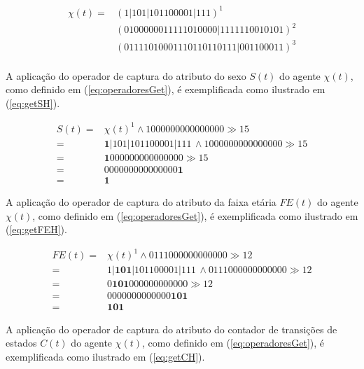 \begin{equation}
\begin{split}
 \chi(t) =   & (1 | 1 0 1 | 1 0 1 1 0 0 0 0 1 | 1 1 1)^1 \\
	     & (0 1 0 0 0 0 0 0 1 1 1 1 1 0 1 0 0 0 0 | 1 1 1 1 1 1 0 0 1 0 1 0 1)^2 \\
	     & (0 1 1 1 1 0 1 0 0 0 1 1 1 0 1 1 0 1 1 0 1 1 1 | 0 0 1 1 0 0 0 1 1)^3 \\
 \label{eq:Exemplo1}
\end{split}
\end{equation}

A aplicação do operador de captura do atributo do sexo $S(t)$ do agente $\chi(t)$, como definido em (\ref{eq:operadoresGet}), é exemplificada como ilustrado em (\ref{eq:getSH}).

\begin{equation}
 \begin{split}
 S(t) = & \chi(t)^1 \wedge 1000000000000000 \gg 15 \\
      = & \boldsymbol{1} | 1 0 1 | 1 0 1 1 0 0 0 0 1 | 1 1 1 \, \wedge 1000000000000000 \gg 15 \\
      = & \boldsymbol{1} 0 0 0 0 0 0 0 0 0 0 0 0 0 0 0 \gg 15 \\
      = & 0 0 0 0 0 0 0 0 0 0 0 0 0 0 0 \boldsymbol{1} \\
      = & \boldsymbol{1}
 \label{eq:getSH}
 \end{split}
\end{equation}

A aplicação do operador de captura do atributo da faixa etária $FE(t)$ do agente $\chi(t)$, como definido em (\ref{eq:operadoresGet}), é exemplificada como ilustrado em (\ref{eq:getFEH}).

\begin{equation}
 \begin{split}
 FE(t) = & \chi(t)^1 \wedge 0111000000000000 \gg 12 \\
       = & 1 | \boldsymbol{1 0 1} | 1 0 1 1 0 0 0 0 1 | 1 1 1 \, \wedge 0111000000000000 \gg 12 \\
       = & 0 \boldsymbol{1 0 1} 0 0 0 0 0 0 0 0 0 0 0 0 \gg 12 \\
       = & 0 0 0 0 0 0 0 0 0 0 0 0 0 \boldsymbol{1 0 1} \\
       = & \boldsymbol{1 0 1}
 \label{eq:getFEH}
 \end{split}
\end{equation}

A aplicação do operador de captura do atributo do contador de transições de estados $C(t)$ do agente $\chi(t)$, como definido em (\ref{eq:operadoresGet}), é exemplificada como ilustrado em (\ref{eq:getCH}).

